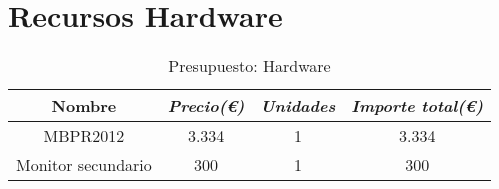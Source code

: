 \section{Recursos Hardware}

\begin{table}[htp]
	\centering
	\caption{Presupuesto: Hardware}\label{tab:budget-hardware}
	\begin{tabular}{cccc}
		\toprule
    	\textbf{Nombre} & \emph{Precio(\euro)} & \emph{Unidades} & \emph{Importe total(\euro)}\\
    	\midrule
    	MBPR2012			& 	3.334			&	1 			&	3.334					\\
    	Monitor secundario	&	300				&	1			&	300						\\
    	\bottomrule
    \end{tabular}
\end{table}